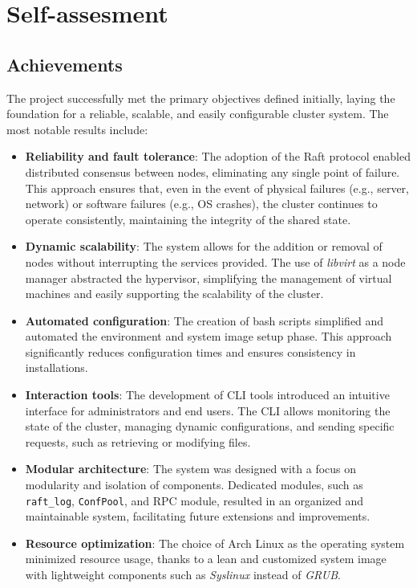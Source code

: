 \section{Self-assesment}
\subsection{Achievements}
The project successfully met the primary objectives defined initially, laying the 
foundation for a reliable, scalable, and easily configurable cluster system. The most 
notable results include:
\begin{itemize}
  \item \textbf{Reliability and fault tolerance}: The adoption of the Raft protocol 
    enabled distributed consensus between nodes, eliminating any single point of failure. 
    This approach ensures that, even in the event of physical failures (e.g., server, 
    network) or software failures (e.g., OS crashes), the cluster continues to operate 
    consistently, maintaining the integrity of the shared state.

  \item \textbf{Dynamic scalability}: The system allows for the addition or removal 
    of nodes without interrupting the services provided. The use of \textit{libvirt} as a node 
    manager abstracted the hypervisor, simplifying the management of virtual machines 
    and easily supporting the scalability of the cluster.

  \item \textbf{Automated configuration}: The creation of bash scripts simplified 
    and automated the environment and system image setup phase. This approach 
    significantly reduces configuration times and ensures consistency in installations.

  \item \textbf{Interaction tools}: The development of CLI tools introduced an intuitive 
    interface for administrators and end users. The CLI allows monitoring the state of
    the cluster, managing dynamic configurations, and sending specific requests, such 
    as retrieving or modifying files.

  \item \textbf{Modular architecture}: The system was designed with a focus on modularity 
    and isolation of components. Dedicated modules, such as \texttt{raft\_log}, \texttt{ConfPool}, and RPC 
    module, resulted in an organized and maintainable system, facilitating future extensions 
    and improvements.

  \item \textbf{Resource optimization}: The choice of Arch Linux as the operating system 
    minimized resource usage, thanks to a lean and customized system image with 
    lightweight components such as \textit{Syslinux} instead of \textit{GRUB}.
\end{itemize}

